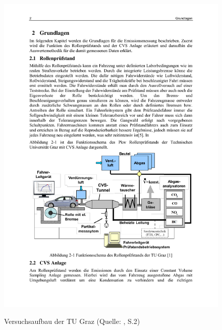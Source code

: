 \begin{figure}[H]
	\myfloatalign
	{\includegraphics[width=.9\linewidth]{gfx/related/graz_versuch.pdf}} \quad
	\caption[Versuchsaufbau der TU Graz (Quelle: \cite{auswertemethodik}, S.2)]
	{Versuchsaufbau der TU Graz (Quelle: \cite{auswertemethodik}, S.2)}
	\label{fig:aufbau_graz}
\end{figure}
